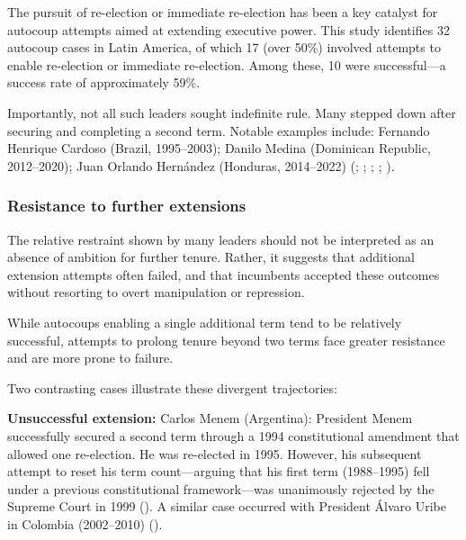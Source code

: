 \documentclass[
  12pt,
]{report}
\begin{document}
The pursuit of re-election or immediate re-election has been a key
catalyst for autocoup attempts aimed at extending executive power. This
study identifies 32 autocoup cases in Latin America, of which 17 (over
50\%) involved attempts to enable re-election or immediate re-election.
Among these, 10 were successful---a success rate of approximately 59\%.

Importantly, not all such leaders sought indefinite rule. Many stepped
down after securing and completing a second term. Notable examples
include: Fernando Henrique Cardoso (Brazil, 1995--2003); Danilo Medina
(Dominican Republic, 2012--2020); Juan Orlando Hernández (Honduras,
2014--2022) (;
;
;
; ).

\subsubsection*{Resistance to further
extensions}\label{resistance-to-further-extensions}

The relative restraint shown by many leaders should not be interpreted
as an absence of ambition for further tenure. Rather, it suggests that
additional extension attempts often failed, and that incumbents accepted
these outcomes without resorting to overt manipulation or repression.

While autocoups enabling a single additional term tend to be relatively
successful, attempts to prolong tenure beyond two terms face greater
resistance and are more prone to failure.

Two contrasting cases illustrate these divergent trajectories:

\textbf{Unsuccessful extension:} Carlos Menem (Argentina): President
Menem successfully secured a second term through a 1994 constitutional
amendment that allowed one re-election. He was re-elected in 1995.
However, his subsequent attempt to reset his term count---arguing that
his first term (1988--1995) fell under a previous constitutional
framework---was unanimously rejected by the Supreme Court in 1999
(). A similar case occurred with
President Álvaro Uribe in Colombia (2002--2010)
().
\end{document}
